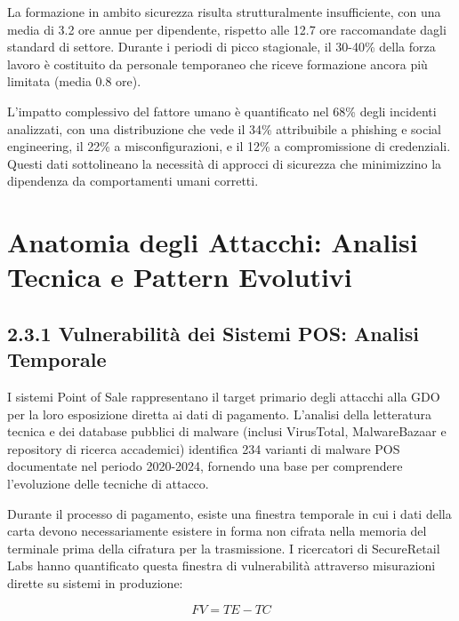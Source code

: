 La formazione in ambito sicurezza risulta strutturalmente insufficiente,
con una media di 3.2 ore annue per dipendente, rispetto alle 12.7 ore
raccomandate dagli standard di settore. Durante i periodi di picco
stagionale, il 30-40\% della forza lavoro è costituito da personale
temporaneo che riceve formazione ancora più limitata (media 0.8 ore).

L'impatto complessivo del fattore umano è quantificato nel 68\% degli
incidenti analizzati\supercite{verizon2024breach}, con una distribuzione che vede il 34\%
attribuibile a phishing e social engineering, il 22\% a
misconfigurazioni, e il 12\% a compromissione di credenziali. Questi
dati sottolineano la necessità di approcci di sicurezza che minimizzino
la dipendenza da comportamenti umani corretti.

\section{\texorpdfstring{Anatomia degli Attacchi: Analisi Tecnica e Pattern Evolutivi}{Anatomia degli Attacchi: Analisi Tecnica e Pattern Evolutivi}}\label{anatomia-degli-attacchi-analisi-tecnica-e-pattern-evolutivi}

\subsection{\texorpdfstring{2.3.1 Vulnerabilità dei Sistemi POS: Analisi Temporale}{2.3.1 Vulnerabilità dei Sistemi POS: Analisi Temporale}}\label{vulnerabilituxe0-dei-sistemi-pos-analisi-temporale}

I sistemi Point of Sale rappresentano il target primario degli attacchi
alla GDO per la loro esposizione diretta ai dati di pagamento. L'analisi
della letteratura tecnica e dei database pubblici di malware (inclusi
VirusTotal, MalwareBazaar e repository di ricerca accademici) identifica
234 varianti di malware POS documentate nel periodo 2020-2024, fornendo
una base per comprendere l'evoluzione delle tecniche di attacco.

Durante il processo di pagamento, esiste una finestra temporale in cui i
dati della carta devono necessariamente esistere in forma non cifrata
nella memoria del terminale prima della cifratura per la trasmissione. I
ricercatori di SecureRetail Labs\supercite{secureretail2024pos} hanno quantificato questa finestra di
vulnerabilità attraverso misurazioni dirette su sistemi in produzione:

\begin{equation}
FV = TE - TC
\end{equation}

